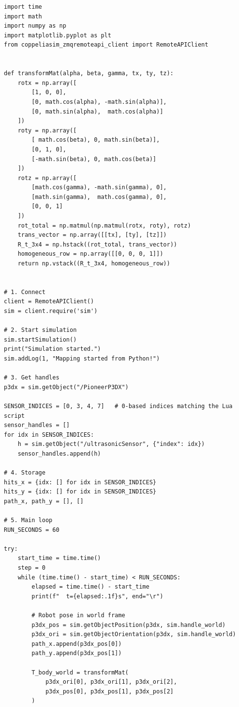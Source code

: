 \documentclass{article}
\begin{document}
\begin{verbatim}
import time
import math
import numpy as np
import matplotlib.pyplot as plt
from coppeliasim_zmqremoteapi_client import RemoteAPIClient


def transformMat(alpha, beta, gamma, tx, ty, tz):
    rotx = np.array([
        [1, 0, 0],
        [0, math.cos(alpha), -math.sin(alpha)],
        [0, math.sin(alpha),  math.cos(alpha)]
    ])
    roty = np.array([
        [ math.cos(beta), 0, math.sin(beta)],
        [0, 1, 0],
        [-math.sin(beta), 0, math.cos(beta)]
    ])
    rotz = np.array([
        [math.cos(gamma), -math.sin(gamma), 0],
        [math.sin(gamma),  math.cos(gamma), 0],
        [0, 0, 1]
    ])
    rot_total = np.matmul(np.matmul(rotx, roty), rotz)
    trans_vector = np.array([[tx], [ty], [tz]])
    R_t_3x4 = np.hstack((rot_total, trans_vector))
    homogeneous_row = np.array([[0, 0, 0, 1]])
    return np.vstack((R_t_3x4, homogeneous_row))


# 1. Connect
client = RemoteAPIClient()
sim = client.require('sim')

# 2. Start simulation
sim.startSimulation()
print("Simulation started.")
sim.addLog(1, "Mapping started from Python!")

# 3. Get handles
p3dx = sim.getObject("/PioneerP3DX")

SENSOR_INDICES = [0, 3, 4, 7]   # 0-based indices matching the Lua script
sensor_handles = []
for idx in SENSOR_INDICES:
    h = sim.getObject("/ultrasonicSensor", {"index": idx})
    sensor_handles.append(h)

# 4. Storage
hits_x = {idx: [] for idx in SENSOR_INDICES}
hits_y = {idx: [] for idx in SENSOR_INDICES}
path_x, path_y = [], []

# 5. Main loop
RUN_SECONDS = 60

try:
    start_time = time.time()
    step = 0
    while (time.time() - start_time) < RUN_SECONDS:
        elapsed = time.time() - start_time
        print(f"  t={elapsed:.1f}s", end="\r")

        # Robot pose in world frame
        p3dx_pos = sim.getObjectPosition(p3dx, sim.handle_world)
        p3dx_ori = sim.getObjectOrientation(p3dx, sim.handle_world)
        path_x.append(p3dx_pos[0])
        path_y.append(p3dx_pos[1])

        T_body_world = transformMat(
            p3dx_ori[0], p3dx_ori[1], p3dx_ori[2],
            p3dx_pos[0], p3dx_pos[1], p3dx_pos[2]
        )


\end{verbatim}
\end{document}

